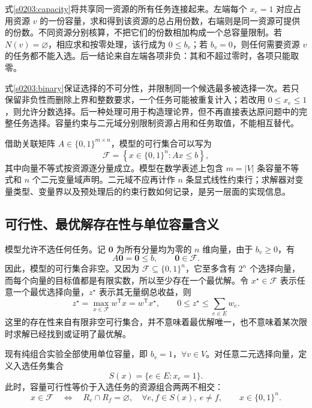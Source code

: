 式\eqref{s0203:capacity}将共享同一资源的所有任务连接起来。左端每个 $x_e=1$ 对应占用资源 $v$ 的一份容量，求和得到该资源的总占用份数，右端则是同一资源可提供的份数。不同资源分别核算，不把它们的份数相加构成一个总容量限制。若 $N(v)=\varnothing$，相应求和按零处理，该行成为 $0\leq b_v$；若 $b_v=0$，则任何需要资源 $v$ 的任务都不能入选。后一结论来自左端各项非负：其和不超过零时，各项只能取零。

式\eqref{s0203:binary}保证选择的不可分性，并限制同一个候选最多被选择一次。若只保留非负性而删除上界和整数要求，一个任务可能被重复计入；若改用 $0\leq x_e\leq1$，则允许分数选择。后一种处理可用于构造理论界，但不再直接表达原问题中的完整任务选择。容量约束与二元域分别限制资源占用和任务取值，不能相互替代。

借助关联矩阵 $A\in\{0,1\}^{m\times n}$，模型的可行集合可以写为
\begin{equation}
 \mathcal F=
 \left\{x\in\{0,1\}^{n}:Ax\leq b\right\},
 \label{s0203:feasible_set}
\end{equation}
其中向量不等式按资源逐分量成立。模型在数学表述上包含 $m=|V|$ 条容量不等式和 $n$ 个二元变量域声明。二元域不应再计作 $n$ 条显式线性约束行；求解器对变量类型、变量界以及预处理后的约束行数如何记录，是另一层面的实现信息。

\subsection{可行性、最优解存在性与单位容量含义}

模型允许不选任何任务。记 $\boldsymbol 0$ 为所有分量均为零的 $n$ 维向量，由于 $b_v\geq0$，有
\begin{equation}
 A\boldsymbol 0=\boldsymbol 0\leq b,
 \qquad \boldsymbol 0\in\mathcal F.
 \label{s0203:zero_feasible}
\end{equation}
因此，模型的可行集合非空。又因为 $\mathcal F\subseteq\{0,1\}^{n}$，它至多含有 $2^n$ 个选择向量，而每个向量的目标值都是有限实数，所以至少存在一个最优解。令 $x^\star\in\mathcal F$ 表示任意一个最优选择向量，$z^\star$ 表示其无量纲总收益，则
\begin{equation}
 z^\star=\max_{x\in\mathcal F}w^{\mathsf T}x
 =w^{\mathsf T}x^\star,
 \qquad
 0\leq z^\star\leq\sum_{e\in E}w_e.
 \label{s0203:existence_bound}
\end{equation}
这里的存在性来自有限非空可行集合，并不意味着最优解唯一，也不意味着某次限时求解已经找到或证明了最优解。

现有纯组合实验全部使用单位容量，即 $b_v=1$，$\forall v\in V$。对任意二元选择向量，定义入选任务集合
\begin{equation}
 S(x)=\{e\in E:x_e=1\}.
 \label{s0203:selected_set}
\end{equation}
此时，容量可行性等价于入选任务的资源组合两两不相交：
\begin{equation}
 x\in\mathcal F
 \quad\Longleftrightarrow\quad
 R_e\cap R_f=\varnothing,
 \quad
 \forall e,f\in S(x),\ e\ne f,
 \qquad x\in\{0,1\}^{n}.
 \label{s0203:disjoint_equivalence}
\end{equation}

